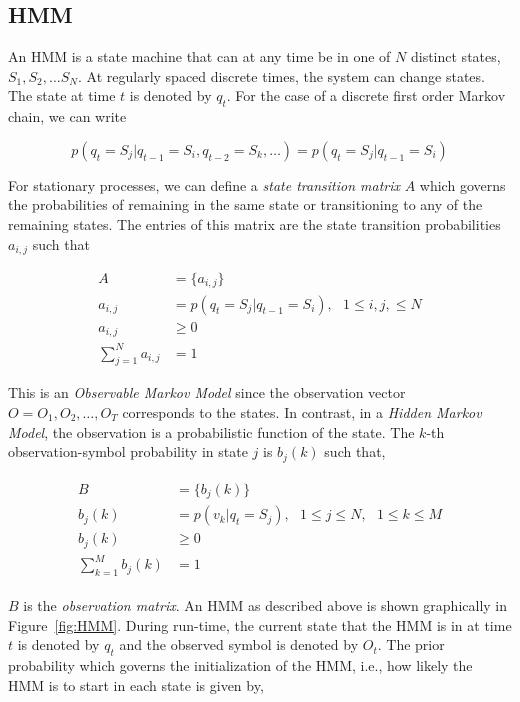 \subsection{HMM}
An HMM is a state machine that can at any time be in one of $N$ distinct states, $S_1, S_2, \ldots S_N$.  At regularly spaced discrete times, the system can change states.  The state at time $t$ is denoted by $q_t$.  For the case of a discrete first order Markov chain, we can write

\begin{equation}
p(q_t = S_j | q_{t-1}= S_i, q_{t-2}= S_k, \ldots)  = p(q_t = S_j | q_{t-1}= S_i)
\end{equation}

For stationary processes, we can define a \emph{state transition matrix} $A$ which governs the probabilities of remaining in the same state or transitioning to any of the remaining states.  The entries of this matrix are the state transition probabilities $a_{i,j}$ such that

\begin{equation}
\begin{array}{llllll}
A &= \{a_{i,j}\}\\
a_{i,j} &= p(q_t = S_j | q_{t-1}= S_i), \ \ \ 1 \leq i, j, \leq N\\
a_{i,j} &\geq 0\\
\sum\limits_{j=1}^N a_{i,j}&=1 
\end{array}
\end{equation}

This is an \emph{Observable Markov Model} since the observation vector $O=O_1, O_2, \ldots, O_T$ corresponds to the states.  In contrast, in a \emph{Hidden Markov Model}, the observation is a probabilistic function of the state.  The $k$-th observation-symbol probability in state $j$ is $b_j(k)$ such that,

\begin{align}
\begin{array}{llllll}
B&=\{b_j(k)\}\\
b_j(k) &= p(v_k | q_t=S_j), \ \ \ 1\leq j \leq N, \ \ \ 1\leq k \leq M \\
b_j(k) &\geq 0\\
\sum\limits_{k=1}^M b_j(k) &=1 
\end{array}
\end{align}

$B$ is the \emph{observation matrix}.  An HMM as described above is shown graphically in Figure~\ref{fig:HMM}.  During run-time, the current state that the HMM is in at time $t$ is denoted by $q_t$ and the observed symbol is denoted by $O_t$.  The prior probability which governs the initialization of the HMM, i.e., how likely the HMM is to start in each state is given by,


